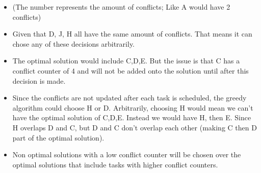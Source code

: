 \documentclass{article}[12pt]
\begin{document}
\begin{itemize}
  \item (The number represents the amount of conflicts; Like A would have 2 conflicts)
  \item Given that D, J, H all have the same amount of conflicts. That means it can chose any of these decisions arbitrarily.
  \item The optimal solution would include C,D,E. But the issue is that C has a conflict counter of 4 and will not be added
    onto the solution until after this decision is made.
  \item Since the conflicts are not updated after each task is scheduled, the greedy algorithm could choose H or D.
    Arbitrarily, choosing H would mean we can't have the optimal solution of C,D,E. 
    Instead we would have H, then E. Since H overlaps D and C, but D and C don't 
    overlap each other (making C then D part of the optimal solution).
  \item Non optimal solutions with a low conflict counter will be chosen over the 
    optimal solutions that include tasks with higher conflict counters.
\end{itemize}
\end{document}
